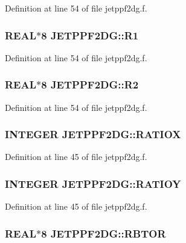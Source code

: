 Definition at line 54 of file jetppf2dg.f.\hypertarget{namespaceJETPPF2DG_a8c481ce2a9d8fee1b017a02d4bf7504}{
\subsubsection[R1]{\setlength{\rightskip}{0pt plus 5cm}REAL$\ast$8 {\bf JETPPF2DG::R1}}}
\label{namespaceJETPPF2DG_a8c481ce2a9d8fee1b017a02d4bf7504}




Definition at line 54 of file jetppf2dg.f.\hypertarget{namespaceJETPPF2DG_737ed75dab8a61babe35ac43c0a217e2}{
\subsubsection[R2]{\setlength{\rightskip}{0pt plus 5cm}REAL$\ast$8 {\bf JETPPF2DG::R2}}}
\label{namespaceJETPPF2DG_737ed75dab8a61babe35ac43c0a217e2}




Definition at line 54 of file jetppf2dg.f.\hypertarget{namespaceJETPPF2DG_7115e44048e1de47d26e48726e317603}{
\subsubsection[RATIOX]{\setlength{\rightskip}{0pt plus 5cm}INTEGER {\bf JETPPF2DG::RATIOX}}}
\label{namespaceJETPPF2DG_7115e44048e1de47d26e48726e317603}




Definition at line 45 of file jetppf2dg.f.\hypertarget{namespaceJETPPF2DG_c27cb250b47cf21b49de19ad55baff1b}{
\subsubsection[RATIOY]{\setlength{\rightskip}{0pt plus 5cm}INTEGER {\bf JETPPF2DG::RATIOY}}}
\label{namespaceJETPPF2DG_c27cb250b47cf21b49de19ad55baff1b}




Definition at line 45 of file jetppf2dg.f.\hypertarget{namespaceJETPPF2DG_54f18c6794b7739b7bc332cedd97d7f1}{
\subsubsection[RBTOR]{\setlength{\rightskip}{0pt plus 5cm}REAL$\ast$8 {\bf JETPPF2DG::RBTOR}}}
\label{namespaceJETPPF2DG_54f18c6794b7739b7bc332cedd97d7f1}




